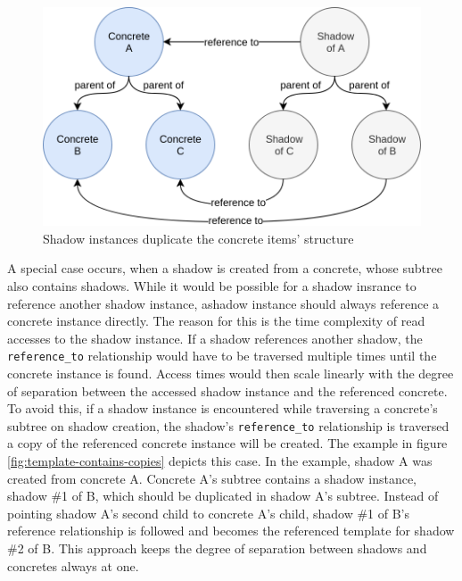 \documentclass[a4paper,11pt]{article}
\def\inline{\lstinline[basicstyle=\ttfamily,keywordstyle={}]}
\begin{document}
                    \begin{figure}
                        \centering
                        \includegraphics[width=.58\textwidth]{concrete-shadow}
                        \caption{Shadow instances duplicate the concrete items' structure}
                        \label{fig:concrete-shadow}
                    \end{figure}

                    A special case occurs, when a shadow is created from
                    a concrete, whose subtree also contains shadows.
                    While it would be possible for a shadow insrance to reference another
                    shadow instance, ashadow instance should always reference a concrete
                    instance directly. The reason for this is the time complexity
                    of read accesses to the shadow instance. If a shadow references
                    another shadow, the \inline{reference_to} relationship would
                    have to be traversed multiple times until the concrete instance
                    is found. Access times would then scale linearly with
                    the degree of separation between the accessed shadow instance
                    and the referenced concrete. To avoid this, if a shadow
                    instance is encountered while traversing a concrete's
                    subtree on shadow creation, the shadow's \inline{reference_to}
                    relationship is traversed a copy of the referenced concrete
                    instance will be created. The example in figure \ref{fig:template-contains-copies}
                    depicts this case. In the example, shadow A was created from
                    concrete A. Concrete A's subtree contains a shadow instance,
                    shadow \#1 of B, which should be duplicated in shadow A's subtree.
                    Instead of pointing shadow A's second child to concrete A's child,
                    shadow \#1 of B's reference relationship is followed and becomes
                    the referenced template for shadow \#2 of B.
                    This approach keeps the degree of separation between shadows
                    and concretes always at one.
\end{document}
